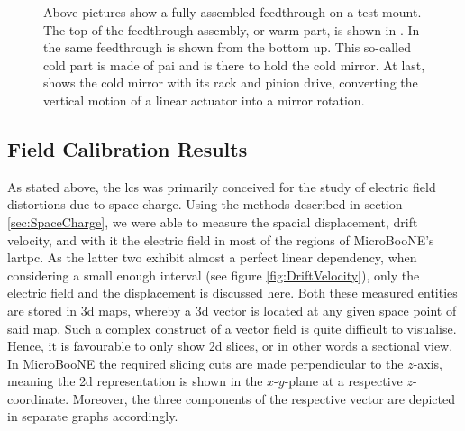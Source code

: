 \begin{figure}[htbp]
{{        \label{fig:ColdMirror}
    }
    }
    \caption[Fully assembled LCS Feedthrough]{Above pictures show a fully assembled feedthrough on a test mount. The top of the feedthrough assembly, or warm part, is shown in . In  the same feedthrough is shown from the bottom up. This so-called cold part is made of \gls{pai} and is there to hold the cold mirror. At last,  shows the cold mirror with its rack and pinion drive, converting the vertical motion of a linear actuator into a mirror rotation.}
    \label{fig:FeedthroughPictures}
\end{figure}

\subsection{Field Calibration Results}
As stated above, the \gls{lcs} was primarily conceived for the study of electric field distortions due to space charge. Using the methods described in section \ref{sec:SpaceCharge}, we were able to measure the spacial displacement, drift velocity, and with it the electric field in most of the regions of MicroBooNE's \gls{lartpc}. As the latter two exhibit almost a perfect linear dependency, when considering a small enough interval (see figure \ref{fig:DriftVelocity}), only the electric field and the displacement is discussed here. Both these measured entities are stored in \gls{3d} maps, whereby a \gls{3d} vector is located at any given space point of said map. Such a complex construct of a vector field is quite difficult to visualise. Hence, it is favourable to only show \gls{2d} slices, or in other words a sectional view. In MicroBooNE the required slicing cuts are made perpendicular to the $z$-axis, meaning the \gls{2d} representation is shown in the $x$-$y$-plane at a respective $z$-coordinate. Moreover, the three components of the respective vector are depicted in separate graphs accordingly.

